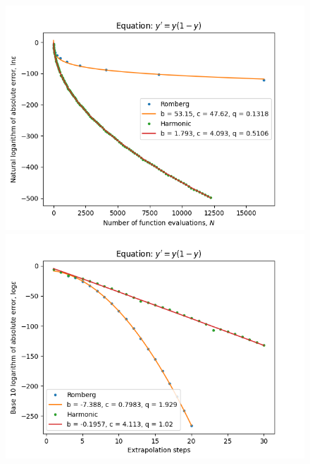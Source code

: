 \begin{figure}[H]
\centering
\begin{minipage}{0.45\textwidth}
\centering
\includegraphics[scale=0.45]{../results/emr_plots/logistic_hp_trend.png}
\end{minipage}
\begin{minipage}{0.45\textwidth}
\centering
\includegraphics[scale=0.45]{../results/emr_plots/logistic_hp_steps.png}
\end{minipage}
\end{figure}

